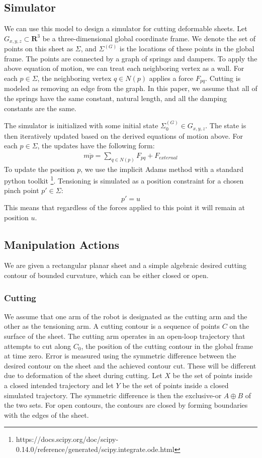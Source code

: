 \subsection*{Simulator}
We can use this model to design a simulator for cutting deformable sheets.
Let $G_{x,y,z} \subset \mathbf{R}^3 $ be a three-dimensional global coordinate frame. 
We denote the set of points on this sheet as $\Sigma$, and $\Sigma^{(G)}$ is the locations of these points in the global frame.
The points are connected by a graph of springs and dampers.
To apply the above equation of motion, we can treat each neighboring vertex as a wall.
For each $p \in \Sigma$, the neighboring vertex $q \in N(p)$ applies a force $F_{pq}$. 
Cutting is modeled as removing an edge from the graph.
In this paper, we assume that all of the springs have the same constant, natural length, and all the damping constants are the same.

The simulator is initialized with some initial state $\Sigma^{(G)}_0 \in G_{x,y,z}$. 
The state is then iteratively updated based on the derived equations of motion above.
For each $p \in \Sigma$, the updates have the following form:
\begin{align}
\label{eq:vertex}
m \ddot{p}  = \sum_{q \in N(p)} F_{pq} + F_{external}
\end{align}
To update the position $p$, we use the implicit Adams method with a standard python toolkit \footnote{https://docs.scipy.org/doc/scipy-0.14.0/reference/generated/scipy.integrate.ode.html}. Tensioning is simulated as a position constraint for a chosen pinch point $p' \in \Sigma$:
\[
p' = u
\]
This means that regardless of the forces applied to this point it will remain at position $u$.

\subsection*{Manipulation Actions}
We are given a rectangular planar sheet and a simple algebraic desired cutting contour of bounded curvature, which can be either closed or open.

\subsubsection{Cutting}
We assume that one arm of the robot is designated as the cutting arm and the other as the tensioning arm. A cutting contour is a sequence of points $C$ on the surface of the sheet. The cutting arm operates in an open-loop trajectory that attempts to cut along $C_0$, the position of the cutting contour in the global frame at time zero.
Error is measured using the symmetric difference between the desired contour on the sheet and the achieved contour cut. These will be different due to deformation of the sheet during cutting.
Let $X$ be the set of points inside a closed intended trajectory and let $Y$ be the set of points inside a closed simulated trajectory. The symmetric difference is then the exclusive-or $A \oplus B$ of the two sets. For open contours, the contours are closed by forming boundaries with the edges of the sheet.

